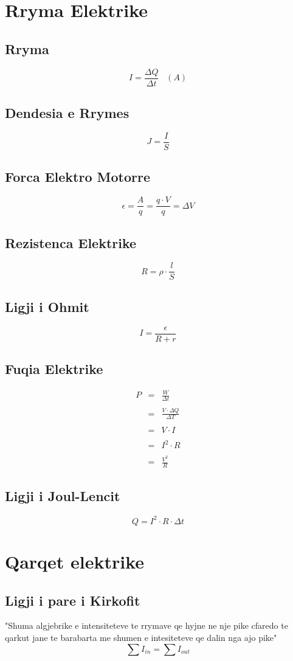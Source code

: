\documentclass[a4paper, twocolumn]{article}
\begin{document}
\section{Rryma Elektrike}
\subsection{Rryma}
\[
	I=\frac{\Delta Q}{\Delta t}\;\;\; (A)
\] 
\subsection{Dendesia e Rrymes}
\[
J=\frac{I}{S}
\] 
\subsection{Forca Elektro Motorre}
\[
	\epsilon = \frac{A}{q}=\frac{q\cdot V}{q}=\Delta V
\] 
\subsection{Rezistenca Elektrike}
\[
R=\rho \cdot \frac{l}{S}
\] 
\subsection{Ligji i Ohmit}
\[
	I=\frac{\epsilon}{R+r}
\] 
\subsection{Fuqia Elektrike}
\begin{eqnarray*}
	P&=&\frac{W}{\Delta t}\\
	\\
	 &=&\frac{V\cdot \Delta Q}{\Delta T}\\
	 \\
	 &=&V\cdot I\\
	 \\
	 &=&I^2 \cdot R\\
	 \\
	 &=& \frac{V^2}{R}
\end{eqnarray*}
\subsection{Ligji i Joul-Lencit}
\[
Q=I^2\cdot R\cdot \Delta t
\] 
\section{Qarqet elektrike}
\subsection{Ligji i pare i Kirkofit}
"Shuma algjebrike e intensiteteve te rrymave qe hyjne ne nje pike cfaredo te qarkut jane te barabarta me shumen e intesiteteve qe dalin nga ajo pike"
\[
	\sum I_{in} = \sum I_{out}
\] 
\end{document}

